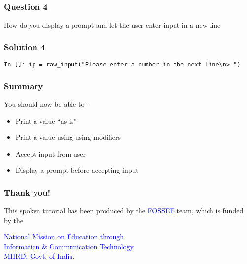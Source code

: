 \documentclass[presentation]{beamer}
\begin{document}
\begin{frame}
\frametitle{Question 4}
\label{sec-8}

  How do you display a prompt and let the user enter input in a new line
\end{frame}
\begin{frame}[fragile]
\frametitle{Solution 4}
\label{sec-9}

\lstset{language=Python}
\begin{lstlisting}
In []: ip = raw_input("Please enter a number in the next line\n> ")
\end{lstlisting}
\end{frame}
\begin{frame}
\frametitle{Summary}
\label{sec-10}

  You should now be able to --
\begin{itemize}
\item Print a value ``as is''
\item Print a value using using modifiers
\item Accept input from user
\item Display a prompt before accepting input
\end{itemize}
\end{frame}
\begin{frame}
\frametitle{Thank you!}
\label{sec-11}

  \begin{block}{}
  \begin{center}
  This spoken tutorial has been produced by the
  \textcolor{blue}{FOSSEE} team, which is funded by the 
  \end{center}
  \begin{center}
    \textcolor{blue}{National Mission on Education through \\
      Information \& Communication Technology \\ 
      MHRD, Govt. of India}.
  \end{center}  
  \end{block}
\end{frame}
\end{document}
